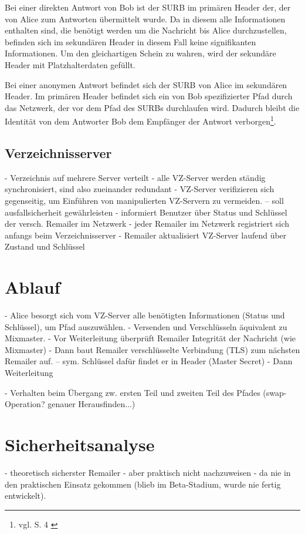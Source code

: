 Bei einer direkten Antwort von Bob ist der SURB im primären Header der, der von Alice zum Antworten übermittelt wurde. Da in diesem alle Informationen enthalten sind, die benötigt werden um die Nachricht bis Alice durchzustellen, befinden sich im sekundären Header in diesem Fall keine signifikanten Informationen. Um den gleichartigen Schein zu wahren, wird der sekundäre Header mit Platzhalterdaten gefüllt.

Bei einer anonymen Antwort befindet sich der SURB von Alice im sekundären Header. Im primären Header befindet sich ein von Bob spezifizierter Pfad durch das Netzwerk, der vor dem Pfad des SURBs durchlaufen wird. Dadurch bleibt die Identität von dem Antworter Bob dem Empfänger der Antwort verborgen\footnote{vgl. S. 4 \cite{mixminion}}.

\subsection{Verzeichnisserver}
- Verzeichnis auf mehrere Server verteilt
- alle VZ-Server werden ständig synchronisiert, sind also zueinander redundant
- VZ-Server verifizieren sich gegenseitig, um Einführen von manipulierten VZ-Servern zu vermeiden.
-- soll ausfallsicherheit gewährleisten
- informiert Benutzer über Status und Schlüssel der versch. Remailer im Netzwerk
- jeder Remailer im Netzwerk registriert sich anfangs beim Verzeichnisserver
- Remailer aktualisiert VZ-Server laufend über Zustand und Schlüssel

\section{Ablauf}
- Alice besorgt sich vom VZ-Server alle benötigten Informationen (Status und Schlüssel), um Pfad auszuwählen.
- Versenden und Verschlüsseln äquivalent zu Mixmaster.
- Vor Weiterleitung überprüft Remailer Integrität der Nachricht (wie Mixmaster)
- Dann baut Remailer verschlüsselte Verbindung (TLS) zum nächsten Remailer auf.
-- sym. Schlüssel dafür findet er in Header (Master Secret)
- Dann Weiterleitung

- Verhalten beim Übergang zw. ersten Teil und zweiten Teil des Pfades (swap-Operation? genauer Herausfinden...)


\section{Sicherheitsanalyse}
- theoretisch sicherster Remailer
- aber praktisch nicht nachzuweisen
- da nie in den praktischen Einsatz gekommen (blieb im Beta-Stadium, wurde nie fertig entwickelt).


